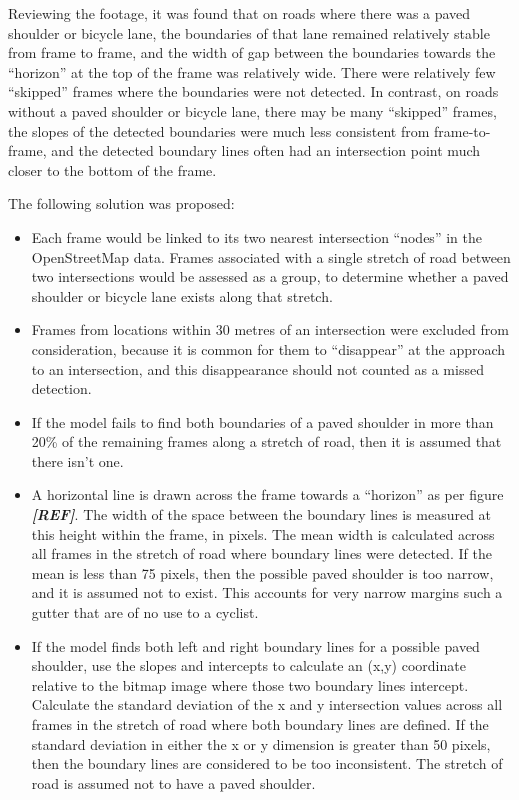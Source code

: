 \documentclass[11pt,twoside]{report}
\newcommand{\remark}[1]{{\bf \em [\marginpar{$\Leftarrow$}#1]}}
\begin{document}
Reviewing the footage, it was found that on roads where there was a paved shoulder or bicycle lane, the boundaries of that lane remained relatively stable from frame to frame, and the width of gap between the boundaries towards the ``horizon'' at the top of the frame was relatively wide.  There were relatively few ``skipped'' frames where the boundaries were not detected.  In contrast, on roads without a paved shoulder or bicycle lane, there may be many ``skipped'' frames, the slopes of the detected boundaries were much less consistent from frame-to-frame, and the detected boundary lines often had an intersection point much closer to the bottom of the frame.

The following solution was proposed:

\begin{itemize}
\item{Each frame would be linked to its two nearest intersection ``nodes'' in the  OpenStreetMap data.  Frames associated with a single stretch of road between two intersections would be assessed as a group, to determine whether a paved shoulder or bicycle lane exists along that stretch.}
\item{Frames from locations within 30 metres of an intersection were excluded from consideration, because it is common for them to ``disappear'' at the approach to an intersection, and this disappearance should not counted as a missed detection.}
\item{If the model fails to find both boundaries of a paved shoulder in more than 20\% of the remaining frames along a stretch of road, then it is assumed that there isn't one.}
\item{A horizontal line is drawn across the frame towards a ``horizon'' as per figure \remark{REF}.  The width of the space between the boundary lines is measured at this height within the frame, in pixels.  The mean width is calculated across all frames in the stretch of road where boundary lines were detected.  If the mean is less than 75 pixels, then the possible paved shoulder is too narrow, and it is assumed not to exist.  This accounts for very narrow margins such a gutter that are of no use to a cyclist.}
\item{If the model finds both left and right boundary lines for a possible paved shoulder, use the slopes and intercepts to calculate an (x,y) coordinate relative to the bitmap image where those two boundary lines intercept.  Calculate the standard deviation of the x and y intersection values across all frames in the stretch of road where both boundary lines are defined.  If the standard deviation in either the x or y dimension is greater than 50 pixels, then the boundary lines are considered to be too inconsistent.  The stretch of road is assumed not to have a paved shoulder.}
\end{itemize}
\end{document}
